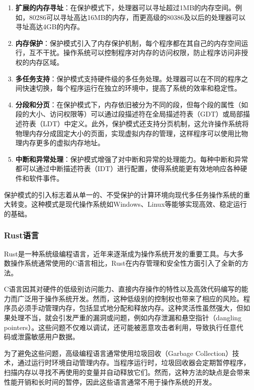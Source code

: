 \begin{enumerate}
    \item \textbf{扩展的内存寻址}：在保护模式下，处理器可以寻址超过1MB的内存空间。例如，80286可以寻址高达16MB的内存，而更高级的80386及以后的处理器可以寻址高达4GB的内存。
    \item \textbf{内存保护}：保护模式引入了内存保护机制，每个程序都在其自己的内存空间运行，互不干扰。操作系统可以控制程序对内存的访问权限，防止程序访问非授权的内存区域。
    \item \textbf{多任务支持}：保护模式支持硬件级的多任务处理。处理器可以在不同的程序之间快速切换，每个程序运行在独立的环境中，提高了系统的效率和稳定性。
    \item \textbf{分段和分页}：在保护模式下，内存依旧被分为不同的段，但每个段的属性（如段的大小、访问权限等）可以通过段描述符在全局描述符表（GDT）或局部描述符表（LDT）中定义。此外，保护模式还支持分页机制，这允许操作系统将物理内存分成固定大小的页面，实现虚拟内存的管理，这样程序可以使用比物理内存更多的虚拟内存地址。
    \item \textbf{中断和异常处理}：保护模式增强了对中断和异常的处理能力。每种中断和异常都可以通过中断描述符表（IDT）进行配置，使得系统能更有效地响应各种硬件和软件事件。
\end{enumerate}

保护模式的引入标志着从单一的、不受保护的计算环境向现代多任务操作系统的重大转变。这种模式是现代操作系统如Windows、Linux等能够实现高效、稳定运行的基础。

\subsubsection{Rust语言}

Rust是一种系统级编程语言，近年来逐渐成为操作系统开发的重要工具。与大多数操作系统通常使用的C语言相比，Rust在内存管理和安全性方面引入了全新的方法。

C语言因其对硬件的低级别访问能力、直接内存操作的特性以及高效代码编写的能力而广泛用于操作系统开发。然而，这种低级别的控制权也带来了相应的风险。程序员必须手动管理内存，包括显式地分配和释放内存。这种灵活性虽然强大，但如果处理不当，就会引发严重的漏洞或问题，例如内存泄漏和悬空指针（dangling pointers）。这些问题不仅难以调试，还可能被恶意攻击者利用，导致执行任意代码或泄露敏感用户数据。

为了避免这些问题，高级编程语言通常使用垃圾回收（Garbage Collection）技术，通过运行时环境自动管理内存。当程序运行时，垃圾回收器会定期暂停程序，扫描内存以寻找不再使用的变量并自动释放它们。然而，这种方法的缺点是会带来性能开销和长时间的暂停，因此这些语言通常不用于操作系统的开发。

